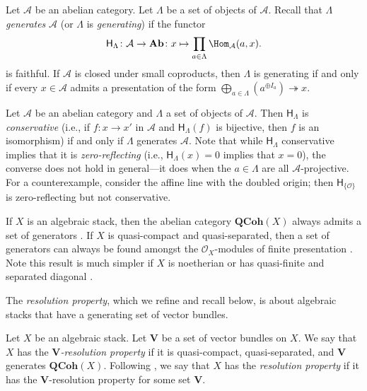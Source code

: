\documentclass[reqno,a4paper]{amsart}
\numberwithin{Theorem}{section}
\newcommand{\Orb}{\mathcal{O}}
\newcommand{\Vect}{\mathbf{V}}
\newcommand{\QCoh}{\mathbf{QCoh}}
\theoremstyle{plain}
\theoremstyle{remark}
\newcommand{\spref}[1]{\href{https://stacks.math.columbia.edu/tag/#1}{#1}}
\begin{document}
Let $\mathcal{A}$ be an abelian category.  Let $\Lambda$ be a set of
objects of $\mathcal{A}$. Recall that $\Lambda$ \emph{generates}
$\mathcal{A}$ (or $\Lambda$ is \emph{generating}) if the functor
\[
  \mathsf{H}_\Lambda \colon \mathcal{A} \to \mathbf{Ab} \colon x\mapsto \prod_{a \in \Lambda} \Hom_{\mathcal{A}}(a,x).
\]
is faithful. If $\mathcal{A}$ is closed under small coproducts, then
$\Lambda$ is generating if and only if every $x\in \mathcal{A}$ admits
a presentation of the form
$\bigoplus_{a\in \Lambda} (a^{\oplus I_a}) \twoheadrightarrow x$.
\begin{remark}\label{R:gens-proj-zref}
  Let $\mathcal{A}$ be an abelian category and $\Lambda$ a set of
  objects of $\mathcal{A}$.  Then $\mathsf{H}_\Lambda$ is
  \emph{conservative} (i.e., if $f \colon x \to x'$ in $\mathcal{A}$
  and $\mathsf{H}_\Lambda(f)$ is bijective, then $f$ is an isomorphism) if and
  only if $\Lambda$ generates $\mathcal{A}$. Note that while
  $\mathsf{H}_\Lambda$ conservative implies that it is
  \emph{zero-reflecting} (i.e., $\mathsf{H}_\Lambda(x) = 0$ implies
  that $x = 0$), the converse does not hold in general---it does when
  the $a \in \Lambda$ are all $\mathcal{A}$-projective. For a
  counterexample, consider the affine line with the doubled origin; then
  $\mathsf{H}_{\{\Orb\}}$ is zero-reflecting but not conservative.
\end{remark}

\begin{Example}\label{E:gens-stack}
  If $X$ is an algebraic stack, then the abelian category $\QCoh(X)$
  always admits a set of generators \cite[Tag
 \spref{0781}]{stacks-project}. If $X$ is quasi-compact and quasi-separated, then 
 a set of generators can always be found amongst the $\Orb_X$-modules of 
 finite presentation \cite{rydh_noetherian-general}. Note this result is much simpler
 if $X$ is noetherian \cite[Prop.~15.4]{LMB} or has quasi-finite and separated diagonal \cite{rydh-2009}.
\end{Example} 
The \emph{resolution property}, which we refine and recall below, is about algebraic stacks that have a generating set of vector bundles.
\begin{Definition} \label{D:res-prop} Let $X$ be an algebraic
	stack. Let $\Vect$ be a set of vector bundles on
	$X$. We say that $X$ has the \emph{$\Vect$-resolution property}
	if it is quasi-compact, quasi-separated, and $\Vect$ generates
	$\QCoh(X)$. Following \cite[Def. 5.1]{2013arXiv1306.5418G}, we say that $X$ has the \emph{resolution
		property} if it has the $\Vect$-resolution property for some set $\Vect$.
\end{Definition}
\end{document}
